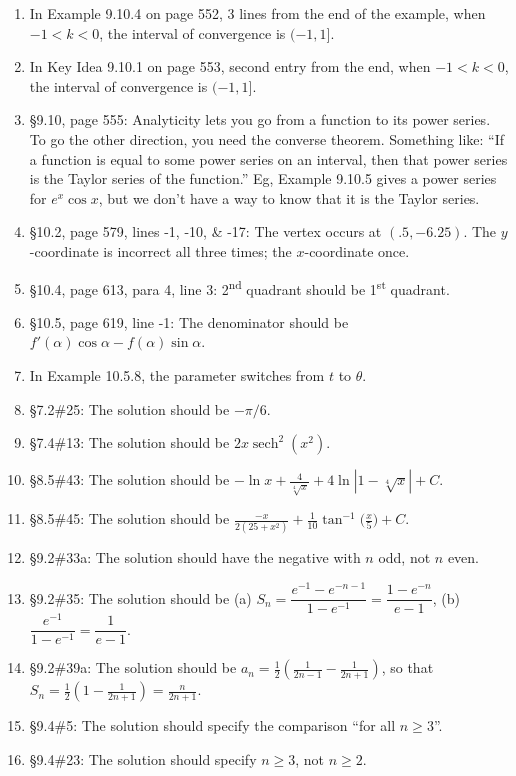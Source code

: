 \documentclass{amsart}
\newcommand{\ds}{\displaystyle}
\newcommand{\abs}[1]{\left\lvert#1\right\rvert}
\DeclareMathOperator{\sech}{sech}
\begin{document}
\begin{enumerate}
\item In Example 9.10.4 on page 552, 3 lines from the end of the example, when $-1<k<0$, the interval of convergence is $(-1,1]$.
\item In Key Idea 9.10.1 on page 553, second entry from the end, when $-1<k<0$, the interval of convergence is $(-1,1]$.
\item \S9.10, page 555: Analyticity lets you go from a function to its power series.  To go the other direction, you need the converse theorem.  Something like: ``If a function is equal to some power series on an interval, then that power series is the Taylor series of the function.''  Eg, Example 9.10.5 gives a power series for $e^x\cos x$, but we don't have a way to know that it is the Taylor series.
\item \S10.2, page 579, lines -1, -10, \& -17: The vertex occurs at $(.5,-6.25)$.  The $y$-coordinate is incorrect all three times; the $x$-coordinate once.
\item \S10.4, page 613, para 4, line 3: 2\textsuperscript{nd} quadrant should be 1\textsuperscript{st} quadrant.
\item \S10.5, page 619, line -1: The denominator should be $f'(\alpha)\cos\alpha-f(\alpha)\sin\alpha$.
\item In Example 10.5.8, the parameter switches from $t$ to $\theta$.
\item \S7.2\#25: The solution should be $-\pi/6$.
\item \S7.4\#13: The solution should be $2x\sech^2(x^2)$.
\item \S8.5\#43: The solution should be $\ds-\ln x+\frac4{\sqrt[4]{x}}+4\ln\abs{1-\sqrt[4]{x}}+C$.
\item \S8.5\#45: The solution should be $\ds\frac{-x}{2(25+x^2)}+\frac1{10}\tan^{-1}\bigl(\frac x5\bigr)+C$.
\item \S9.2\#33a: The solution should have the negative with $n$ odd, not $n$ even.
\item \S9.2\#35: The solution should be (a) $S_n=\dfrac{e^{-1}-e^{-n-1}}{1-e^{-1}}=\dfrac{1-e^{-n}}{e-1}$, (b) $\dfrac{e^{-1}}{1-e^{-1}}=\dfrac1{e-1}$.
\item \S9.2\#39a: The solution should be $a_n = \frac12\left(\frac{1}{2n-1}-\frac{1}{2n+1}\right)$, so that $S_n=\frac12\left(1-\frac1{2n+1}\right) = \frac{n}{2n+1}$.
\item \S9.4\#5: The solution should specify the comparison ``for all $n\ge 3$''.
\item \S9.4\#23: The solution should specify $n\ge3$, not $n\ge2$.

\end{enumerate}
\end{document}
